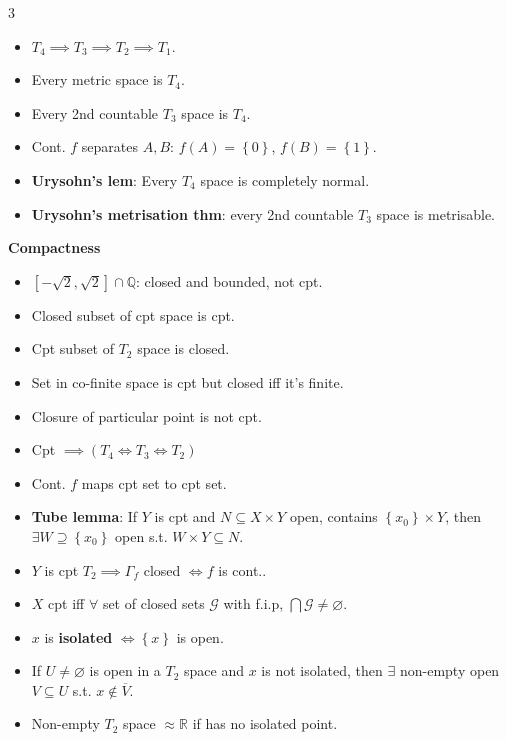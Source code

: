 \documentclass[10pt]{article}
\newcommand{\R}{\mathbb{R}} %
\newcommand{\Q}{\mathbb{Q}} %
\begin{document}
\begin{multicols*}{3}
\begin{itemize}
            \item $T_4 \implies T_3 \implies T_2 \implies T_1$.
            \item Every metric space is $T_4$.
            \item Every 2nd countable $T_3$ space is $T_4$.
            \item Cont. $f$ separates $A, B$: $f\left(A\right) = \left\{0\right\}$, $f\left(B\right) = \left\{1\right\}$.
            \item \textbf{Urysohn's lem}: Every $T_4$ space is completely normal.
            \item \textbf{Urysohn's metrisation thm}: every 2nd countable $T_3$ space is metrisable.
        \end{itemize}
        \textbf{Compactness}
        \begin{itemize}
            \setlength\itemsep{0.11em}
            \item $\left[-\sqrt{2}, \sqrt{2}\right] \cap \Q$: closed and bounded, not cpt.
            \item Closed subset of cpt space is cpt.
            \item Cpt subset of $T_2$ space is closed.
            \item Set in co-finite space is cpt but closed iff it's finite.
            \item Closure of particular point is not cpt.
            \item Cpt $\implies (T_4 \iff T_3 \iff T_2)$
            \item Cont. $f$ maps cpt set to cpt set.
            \item \textbf{Tube lemma}: If $Y$ is cpt and $N \subseteq X \times Y$ open, contains $\left\{x_0\right\} \times Y$, then $\exists W \supseteq \left\{x_0\right\}$ open s.t. $W \times Y \subseteq N$.
            \item $Y$ is cpt $T_2 \implies \Gamma_f$ closed $\iff f$ is cont..
            \item $X$ cpt iff $\forall$ set of closed sets $\mathcal{G}$ with f.i.p, $\bigcap\mathcal{G} \neq \varnothing$.
            \item $x$ is \textbf{isolated} $\iff \left\{x\right\}$ is open.
            \item If $U \neq \varnothing$ is open in a $T_2$ space and $x$ is not isolated, then $\exists$ non-empty open $V \subseteq U$ s.t. $x \notin \overline{V}$.
            \item Non-empty $T_2$ space $\approx \R$ if has no isolated point.

\end{itemize}
\end{multicols*}
\end{document}
